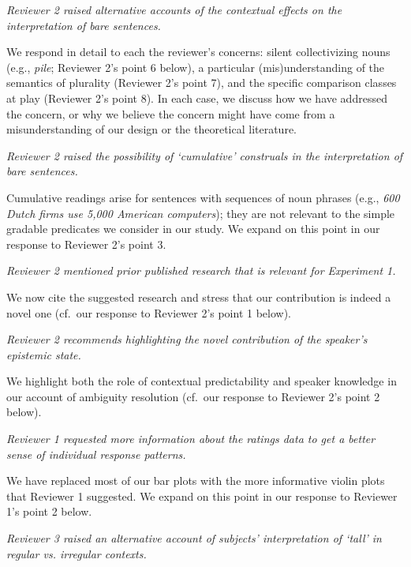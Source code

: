 \documentclass[12pt]{article}
\begin{document}
\item \emph{Reviewer 2 raised alternative accounts of the contextual effects on the interpretation of bare sentences.}

We respond in detail to each the reviewer's concerns: silent collectivizing nouns (e.g., \emph{pile}; Reviewer 2's point 6 below), a particular (mis)understanding of the semantics of plurality (Reviewer 2's point 7), and the specific comparison classes at play (Reviewer 2's point 8). In each case, we discuss how we have addressed the concern, or why we believe the concern might have come from a misunderstanding of our design or the theoretical literature. 

\item \emph{Reviewer 2 raised the possibility of `cumulative' construals in the interpretation of bare sentences.}

Cumulative readings arise for sentences with sequences of noun phrases (e.g., \emph{600 Dutch firms use 5,000 American computers}); they are not relevant to the simple gradable predicates we consider in our study. We expand on this point in our response to Reviewer 2's point 3.

\item \emph{Reviewer 2 mentioned prior published research that is relevant for Experiment 1.}

We now cite the suggested research and stress that our contribution is indeed a novel one (cf.~our response to Reviewer 2's point 1 below).

\item \emph{Reviewer 2 recommends highlighting the novel contribution of the speaker's epistemic state.}

We highlight both the role of contextual predictability and speaker knowledge in our account of ambiguity resolution (cf.~our response to Reviewer 2's point 2 below).

\item \emph{Reviewer 1 requested more information about the ratings data to get a better sense of individual response patterns.}

We have replaced most of our bar plots with the more informative violin plots that Reviewer 1 suggested. We expand on this point in our response to Reviewer 1's point 2 below.

\item \emph{Reviewer 3 raised an alternative account of subjects' interpretation of `tall' in regular vs. irregular contexts.}
\end{document}
